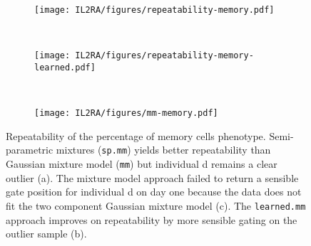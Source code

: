 \begin{figure}[h]
\begin{subfigure}[h]{.5\textwidth}
   \texttt{[image: IL2RA/figures/repeatability-memory.pdf]}
   \caption{}
   \label{figure:repeatability-memory}
\end{subfigure}
~
\begin{subfigure}[h]{.5\textwidth}
   \texttt{[image: IL2RA/figures/repeatability-memory-learned.pdf]}
   \caption{}
   \label{figure:repeatability-memory-learned}
\end{subfigure}
~
\begin{subfigure}[h]{\textwidth}
   \texttt{[image: IL2RA/figures/mm-memory.pdf]}
   \caption{}
   \label{figure:mm-memory}
\end{subfigure}
{Repeatability of the percentage of memory cells phenotype.}
{
Semi-parametric mixtures (\texttt{sp.mm}) yields better repeatability than Gaussian mixture model (\texttt{mm}) but individual d remains a clear outlier (a).
The mixture model approach failed to return a sensible gate position for individual d on day one because the data does not fit the two component Gaussian mixture model (c).
The \texttt{learned.mm} approach improves on repeatability by more sensible gating on the outlier sample (b).
}
\end{figure}


